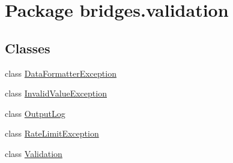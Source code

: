 \hypertarget{namespacebridges_1_1validation}{}\section{Package bridges.\+validation}
\label{namespacebridges_1_1validation}
\subsection*{Classes}
\begin{DoxyCompactItemize}
\item 
class \mbox{\hyperlink{classbridges_1_1validation_1_1_data_formatter_exception}{Data\+Formatter\+Exception}}
\item 
class \mbox{\hyperlink{classbridges_1_1validation_1_1_invalid_value_exception}{Invalid\+Value\+Exception}}
\item 
class \mbox{\hyperlink{classbridges_1_1validation_1_1_output_log}{Output\+Log}}
\item 
class \mbox{\hyperlink{classbridges_1_1validation_1_1_rate_limit_exception}{Rate\+Limit\+Exception}}
\item 
class \mbox{\hyperlink{classbridges_1_1validation_1_1_validation}{Validation}}
\end{DoxyCompactItemize}
